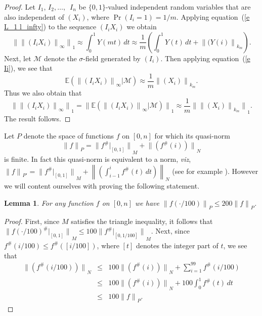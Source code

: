 \documentclass[12pt]{amsart}
\newtheorem{lemma}[thm]{Lemma}
\newcommand{\E}{{\mathbb E}}
\newcommand{\normo}[1]{{\left\|#1\right\|}}
\newcommand{\snormo}[1]{{\mathopen\|#1\mathclose\|}}
\begin{document}
\begin{proof}
Let $I_1$, $I_2,\dots,$\ $I_n$ be $\{0,1\}$-valued
independent random variables that
are also independent of $(X_i)$, where $\Pr(I_i = 1) = 1/m$.  
Applying equation~(\ref{e L_1 l_infty})
to the sequence $(I_i X_i)$ we obtain
\begin{equation}
\label{e Ii}
   \snormo{\snormo{(I_i X_i)}_\infty}_1 
   \approx \int_0^1 Y(mt) \, dt
   \approx \frac1m \left( \int_0^1 Y(t) \, dt + 
   \snormo{(Y(i)}_{k_m} \right).
\end{equation}
Next, let $\mathcal M$ denote the $\sigma$-field generated by $(I_i)$.
Then applying equation~(\ref{e Ii}), we see that
\[
   \E(\snormo{(I_i X_i)}_\infty | \mathcal M)
   \approx \frac1m \snormo{(X_i)}_{k_m} . \]
Thus we also obtain that
\[
   \snormo{\snormo{(I_i X_i)}_\infty}_1 
   = \snormo{ \E(\snormo{(I_i X_i)}_\infty | \mathcal M) }_1
   \approx
   \frac1m \snormo{\snormo{(X_i)}_{k_m}}_1 .\]
The result follows.
\end{proof}

Let $P$ denote the space of functions $f$ on $[0,n]$ for which its quasi-norm
\[
   \snormo f_P = \snormo{f^\#|_{[0,1]}}_M + \snormo{(f^\#(i))}_N
\]
is finite.  In fact this quasi-norm is equivalent to a norm, \emph{viz},
$\snormo f_{P'} = \snormo{f^\#|_{[0,1]}}_M 
    + \normo{\left(\int_{i-1}^i f^\#(t) \, dt\right)}_N$ (see for example
\cite[Section~7]{montgomery-smith-semenov}).  However we will content ourselves
with proving the following statement.

\begin{lemma}
\label{l dilate P} For any function $f$ on $[0,n]$ we have
$\snormo{f(\cdot/100)}_P \le 200 \snormo f_P$.
\end{lemma}

\begin{proof}
First, since $M$ satisfies the triangle inequality, it follows
that 
$\snormo{f(\cdot/100)^\#|_{[0,1]}}_M \le 100\snormo{f^\#|_{[0,1/100]}}_M$.  
Next, since $f^\#(i/100) \le f^\#([i/100])$, where $[t]$ denotes the integer
part of $t$, we see that
\begin{eqnarray*}
   \snormo{(f^\#(i/100))}_N 
   &\le& 100 \snormo{(f^\#(i))}_N + \sum_{i=1}^{99} f^\#(i/100) \\
   &\le& 100 \snormo{(f^\#(i))}_N + 100 \int_0^1 f^\#(t) \, dt \\
   &\le& 100 \snormo f_P .
\end{eqnarray*}
\end{proof}
\end{document}
